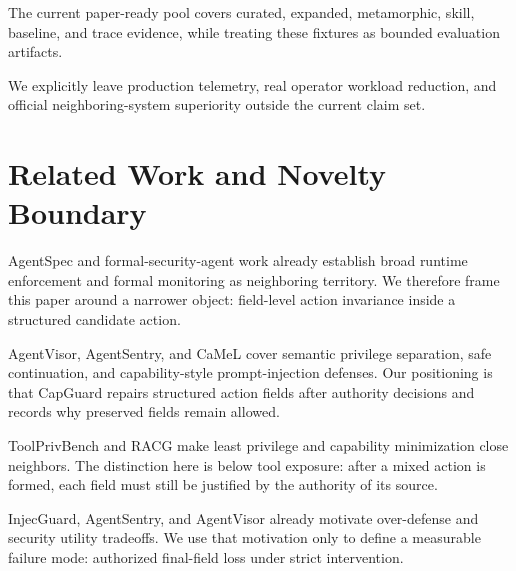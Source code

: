 \documentclass[11pt]{article}
\begin{document}
The current paper-ready pool covers curated, expanded, metamorphic, skill, baseline, and trace evidence, while treating these fixtures as bounded evaluation artifacts.

We explicitly leave production telemetry, real operator workload reduction, and official neighboring-system superiority outside the current claim set.

\section{Related Work and Novelty Boundary}

AgentSpec and formal-security-agent work already establish broad runtime enforcement and formal monitoring as neighboring territory. We therefore frame this paper around a narrower object: field-level action invariance inside a structured candidate action.

AgentVisor, AgentSentry, and CaMeL cover semantic privilege separation, safe continuation, and capability-style prompt-injection defenses. Our positioning is that CapGuard repairs structured action fields after authority decisions and records why preserved fields remain allowed.

ToolPrivBench and RACG make least privilege and capability minimization close neighbors. The distinction here is below tool exposure: after a mixed action is formed, each field must still be justified by the authority of its source.

InjecGuard, AgentSentry, and AgentVisor already motivate over-defense and security utility tradeoffs. We use that motivation only to define a measurable failure mode: authorized final-field loss under strict intervention.
\end{document}
